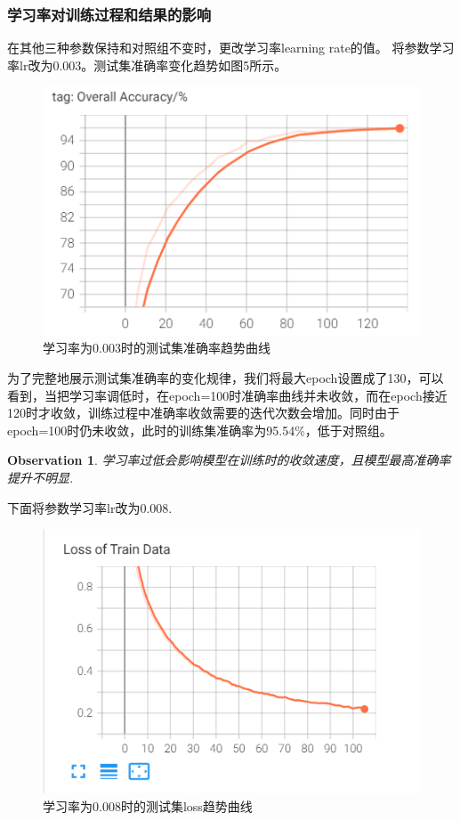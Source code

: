 \documentclass[11pt]{article}
\newtheorem{observation}[theorem]{Observation}
\begin{document}
\subsubsection{学习率对训练过程和结果的影响}
在其他三种参数保持和对照组不变时，更改学习率learning rate的值。
将参数学习率lr改为0.003。测试集准确率变化趋势如图5所示。\par
\begin{figure}[h]
\centering
\includegraphics[scale=0.6]{images/lr003.png}
\caption{学习率为0.003时的测试集准确率趋势曲线}
\end{figure}
为了完整地展示测试集准确率的变化规律，我们将最大epoch设置成了130，可以看到，当把学习率调低时，在epoch=100时准确率曲线并未收敛，而在epoch接近120时才收敛，训练过程中准确率收敛需要的迭代次数会增加。同时由于epoch=100时仍未收敛，此时的训练集准确率为95.54\%，低于对照组。\par
\begin{observation}
学习率过低会影响模型在训练时的收敛速度，且模型最高准确率提升不明显.\par
\end{observation}
下面将参数学习率lr改为0.008.\par
\begin{figure}[H]
\centering
\includegraphics[scale=0.6]{images/loss_train_lr008.png}
\caption{学习率为0.008时的测试集loss趋势曲线}
\end{figure}
\end{document}
